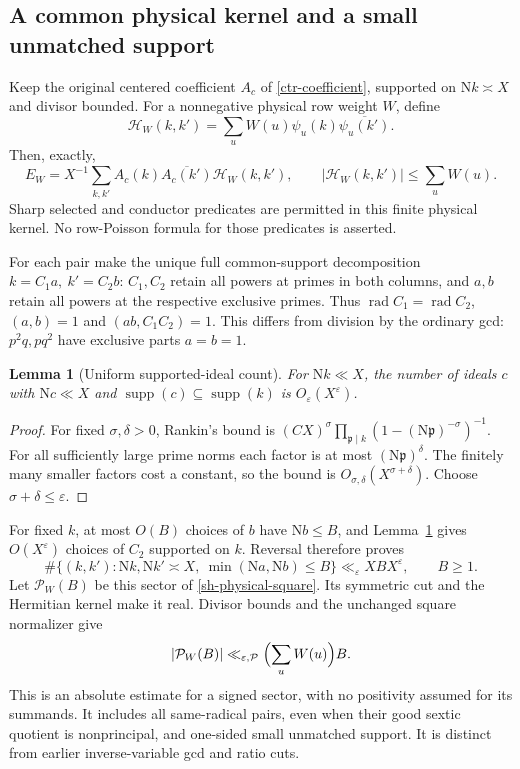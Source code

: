 \documentclass[11pt]{article}
\newtheorem{lemma}[theorem]{Lemma}
\theoremstyle{definition}
\newcommand{\N}{\mathrm N}
\newcommand{\eps}{\varepsilon}
\newcommand{\lls}{\ll_{\eps,\mathcal P}}
\DeclareMathOperator{\rad}{rad}
\DeclareMathOperator{\supp}{supp}
\begin{document}
\subsection{A common physical kernel and a small unmatched support}
Keep the original centered coefficient $A_c$ of
\eqref{ctr-coefficient}, supported on $\N k\asymp X$ and divisor
bounded. For a nonnegative physical row weight $W$, define
\[
 \mathcal H_W(k,k')=\sum_uW(u)\psi_u(k)\overline{\psi_u(k')}.
\]
Then, exactly,
\begin{equation}\label{sh-physical-square}
 E_W=X^{-1}\sum_{k,k'}A_c(k)\overline{A_c(k')}\mathcal H_W(k,k'),
 \qquad |\mathcal H_W(k,k')|\le\sum_uW(u).
\end{equation}
Sharp selected and conductor predicates are permitted in this finite
physical kernel. No row-Poisson formula for those predicates is asserted.

For each pair make the unique full common-support decomposition
$k=C_1a,\ k'=C_2b$: $C_1,C_2$ retain all powers at primes in both
columns, and $a,b$ retain all powers at the respective exclusive primes.
Thus $\rad C_1=\rad C_2$, $(a,b)=1$ and $(ab,C_1C_2)=1$.
This differs from division by the ordinary gcd: $p^2q,pq^2$
have exclusive parts $a=b=1$.

\begin{lemma}[Uniform supported-ideal count]\label{sh-supported-count}
For $\N k\ll X$, the number of ideals $c$ with $\N c\ll X$ and
$\supp(c)\subseteq\supp(k)$ is $O_\eps(X^\eps)$.
\end{lemma}
\begin{proof}
For fixed $\sigma,\delta>0$, Rankin's bound is
$(C X)^\sigma\prod_{\mathfrak p\mid k}
(1-(\N\mathfrak p)^{-\sigma})^{-1}$.
For all sufficiently large prime norms each factor is at most
$(\N\mathfrak p)^\delta$. The finitely many smaller factors cost a
constant, so the bound is $O_{\sigma,\delta}(X^{\sigma+\delta})$.
Choose $\sigma+\delta\le\eps$.
\end{proof}

For fixed $k$, at most $O(B)$ choices of $b$ have $\N b\le B$,
and Lemma~\ref{sh-supported-count} gives $O(X^\eps)$ choices of
$C_2$ supported on $k$. Reversal therefore proves
\[
 \#\{(k,k'):\N k,\N k'\asymp X,\ \min(\N a,\N b)\le B\}
 \ll_\eps XB X^\eps,\qquad B\ge1.
\]
Let $\mathcal P_W(B)$ be this sector of \eqref{sh-physical-square}.
Its symmetric cut and the Hermitian kernel make it real. Divisor
bounds and the unchanged square normalizer give
\begin{equation}\label{sh-pair-sector}
 |\mathcal P_W(B)|\lls \Bigl(\sum_uW(u)\Bigr)B.
\end{equation}
This is an absolute estimate for a signed sector, with no positivity
assumed for its summands. It includes all same-radical pairs, even when
their good sextic quotient is nonprincipal, and one-sided small
unmatched support. It is distinct from earlier inverse-variable
gcd and ratio cuts.
\end{document}
